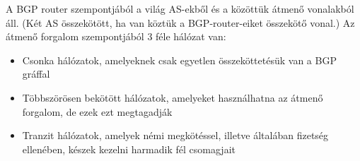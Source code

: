 \documentclass[margin=0px]{article}
\begin{document}
\begin{description}
\begin{itemize}
                  A BGP router szempontjából a világ AS-ekből és a közöttük átmenő vonalakból áll. (Két AS összekötött, ha van köztük a BGP-router-eiket összekötő vonal.)
                  Az átmenő forgalom szempontjából 3 féle hálózat van:
                  \begin{itemize}
                      \item Csonka hálózatok, amelyeknek csak egyetlen összeköttetésük van a BGP gráffal
                      \item Többszörösen bekötött hálózatok, amelyeket használhatna az átmenő forgalom, de ezek ezt megtagadják
                      \item Tranzit hálózatok, amelyek némi megkötéssel, illetve általában fizetség ellenében, készek kezelni harmadik fél csomagjait
                  \end{itemize}
        \end{itemize}
\end{description}
\end{document}
